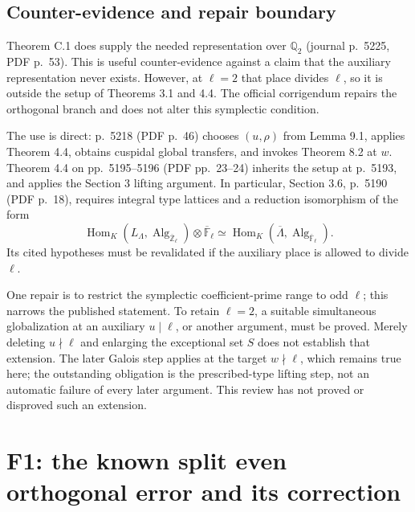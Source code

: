 \documentclass[10pt]{article}
\begin{document}
\subsection*{Counter-evidence and repair boundary}
Theorem C.1 does supply the needed representation over \(\mathbb Q_2\) (journal p. 5225, PDF p. 53). This is useful counter-evidence against a claim that the auxiliary representation never exists. However, at \(\ell=2\) that place divides \(\ell\), so it is outside the setup of Theorems 3.1 and 4.4. The official corrigendum repairs the orthogonal branch and does not alter this symplectic condition.\par
The use is direct: p. 5218 (PDF p. 46) chooses \((u,\rho)\) from Lemma 9.1, applies Theorem 4.4, obtains cuspidal global transfers, and invokes Theorem 8.2 at \(w\). Theorem 4.4 on pp. 5195–5196 (PDF pp. 23–24) inherits the setup at p. 5193, and applies the Section 3 lifting argument. In particular, Section 3.6, p. 5190 (PDF p. 18), requires integral type lattices and a reduction isomorphism of the form \[\operatorname{Hom}_K(L_\Lambda,\operatorname{Alg}_{\overline{\mathbb Z}_\ell})
 \otimes\overline{\mathbb F}_\ell
 \simeq
 \operatorname{Hom}_K(\overline\Lambda,\operatorname{Alg}_{\overline{\mathbb F}_\ell}).\] Its cited hypotheses must be revalidated if the auxiliary place is allowed to divide \(\ell\).\par
One repair is to restrict the symplectic coefficient-prime range to odd \(\ell\); this narrows the published statement. To retain \(\ell=2\), a suitable simultaneous globalization at an auxiliary \(u\mid\ell\), or another argument, must be proved. Merely deleting \(u\nmid\ell\) and enlarging the exceptional set \(S\) does not establish that extension. The later Galois step applies at the target \(w\nmid\ell\), which remains true here; the outstanding obligation is the prescribed-type lifting step, not an automatic failure of every later argument. This review has not proved or disproved such an extension.\par
\section*{F1: the known split even orthogonal error and its correction}
\end{document}
